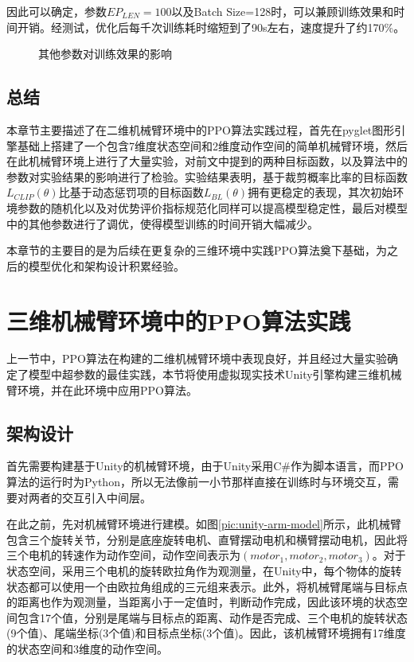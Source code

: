 \documentclass[bachelor]{thesis-uestc}
\begin{document}
	因此可以确定，参数$EP_{LEN}=100$以及Batch Size=128时，可以兼顾训练效果和时间开销。经测试，优化后每千次训练耗时缩短到了90s左右，速度提升了约170\%。

	\begin{figure}[h]
		\centering
		\caption{其他参数对训练效果的影响}
		\label{other-hyperparams}
	\end{figure}
	\subsection{总结}
	本章节主要描述了在二维机械臂环境中的PPO算法实践过程，首先在pyglet图形引擎基础上搭建了一个包含7维度状态空间和2维度动作空间的简单机械臂环境，然后在此机械臂环境上进行了大量实验，对前文中提到的两种目标函数，以及算法中的参数对实验结果的影响进行了检验。实验结果表明，基于裁剪概率比率的目标函数$L_{CLIP}(\theta)$比基于动态惩罚项的目标函数$L_{BL}(\theta)$拥有更稳定的表现，其次初始环境参数的随机化以及对优势评价指标规范化同样可以提高模型稳定性，最后对模型中的其他参数进行了调优，使得模型训练的时间开销大幅减少。
	
	本章节的主要目的是为后续在更复杂的三维环境中实践PPO算法奠下基础，为之后的模型优化和架构设计积累经验。
	
	\section{三维机械臂环境中的PPO算法实践}
	上一节中，PPO算法在构建的二维机械臂环境中表现良好，并且经过大量实验确定了模型中超参数的最佳实践，本节将使用虚拟现实技术Unity引擎构建三维机械臂环境，并在此环境中应用PPO算法。
	\subsection{架构设计}
	首先需要构建基于Unity的机械臂环境，由于Unity采用C\#作为脚本语言，而PPO算法的运行时为Python，所以无法像前一小节那样直接在训练时与环境交互，需要对两者的交互引入中间层。
	
	在此之前，先对机械臂环境进行建模。如图\ref{pic:unity-arm-model}所示，此机械臂包含三个旋转关节，分别是底座旋转电机、直臂摆动电机和横臂摆动电机，因此将三个电机的转速作为动作空间，动作空间表示为$(motor_1, motor_2, motor_3)$。对于状态空间，采用三个电机的旋转欧拉角作为观测量，在Unity中，每个物体的旋转状态都可以使用一个由欧拉角组成的三元组来表示。此外，将机械臂尾端与目标点的距离也作为观测量，当距离小于一定值时，判断动作完成，因此该环境的状态空间包含17个值，分别是尾端与目标点的距离、动作是否完成、三个电机的旋转状态(9个值)、尾端坐标(3个值)和目标点坐标(3个值)。因此，该机械臂环境拥有17维度的状态空间和3维度的动作空间。
	
\end{document}
